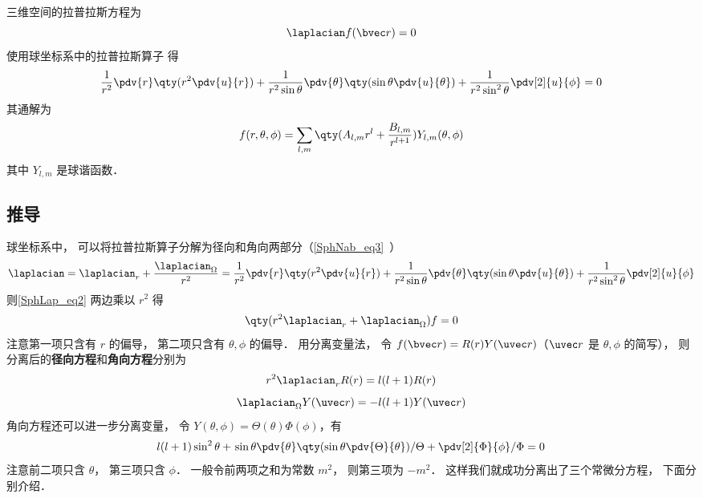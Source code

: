 

三维空间的拉普拉斯方程为
\begin{equation}\label{SphLap_eq2}
\laplacian f(\bvec r) = 0
\end{equation}
使用球坐标系中的拉普拉斯算子 得
\begin{equation}
\frac{1}{r^2} \pdv{r} \qty(r^2 \pdv{u}{r}) + \frac{1}{r^2\sin\theta}\pdv{\theta} \qty(\sin \theta \pdv{u}{\theta}) + \frac{1}{r^2\sin^2 \theta} \pdv[2]{u}{\phi} = 0
\end{equation}
其通解为
\begin{equation}\label{SphLap_eq7}
f(r, \theta, \phi) = \sum_{l,m} \qty(A_{l,m} r^l + \frac{B_{l,m}}{r^{l+1}}) Y_{l,m} (\theta, \phi)
\end{equation}
其中 $Y_{l,m}$ 是球谐函数．

\subsection{推导}
球坐标系中， 可以将拉普拉斯算子分解为径向和角向两部分（\autoref{SphNab_eq3}~）
\begin{equation}\label{SphLap_eq5}
\laplacian = \laplacian_r + \frac{\laplacian_{\Omega}}{r^2} = \frac{1}{r^2} \pdv{r} \qty(r^2 \pdv{u}{r}) + \frac{1}{r^2\sin\theta}\pdv{\theta} \qty(\sin \theta \pdv{u}{\theta}) + \frac{1}{r^2\sin^2 \theta} \pdv[2]{u}{\phi}
\end{equation}
则\autoref{SphLap_eq2} 两边乘以 $r^2$ 得
\begin{equation}
\qty(r^2\laplacian_r + \laplacian_\Omega) f = 0
\end{equation}
注意第一项只含有 $r$ 的偏导， 第二项只含有 $\theta,\phi$ 的偏导． 用分离变量法， 令 $f(\bvec r) = R(r) Y(\uvec r)$（$\uvec r$ 是 $\theta, \phi$ 的简写）， 则分离后的\textbf{径向方程}和\textbf{角向方程}分别为
\begin{equation}\label{SphLap_eq4}
r^2\laplacian_r R(r) = l(l+1)R(r)
\end{equation}
\begin{equation}\label{SphLap_eq1}
\laplacian_{\Omega} Y(\uvec r) = -l(l+1) Y(\uvec r)
\end{equation}
角向方程还可以进一步分离变量， 令 $Y(\theta,\phi) = \Theta(\theta)\Phi(\phi)$，有
\begin{equation}\label{SphLap_eq3}
l(l+1)\sin^2 \theta + \left. \sin\theta\pdv{\theta} \qty(\sin \theta \pdv{\Theta}{\theta}) \middle/ \Theta + \pdv[2]{\Phi}{\phi} \middle/ \Phi = 0 \right.
\end{equation}
注意前二项只含 $\theta$， 第三项只含 $\phi$． 一般令前两项之和为常数 $m^2$， 则第三项为 $-m^2$． 这样我们就成功分离出了三个常微分方程， 下面分别介绍．

